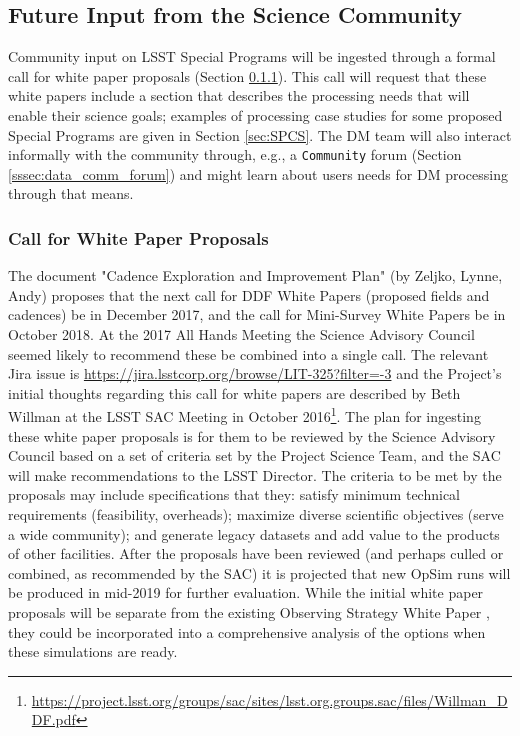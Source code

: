 \documentclass[DM,lsstdraft,toc]{lsstdoc}
\begin{document}
\subsection{Future Input from the Science Community} \label{ssec:data_comm}

Community input on LSST Special Programs will be ingested through a formal call for white paper proposals (Section \ref{sssec:data_comm_call}). This call will request that these white papers include a section that describes the processing needs that will enable their science goals; examples of processing case studies for some proposed Special Programs are given in Section \ref{sec:SPCS}. The DM team will also interact informally with the community through, e.g., a {\tt \Large{Community}} forum (Section \ref{sssec:data_comm_forum}) and might learn about users needs for DM processing through that means.

\subsubsection{Call for White Paper Proposals}\label{sssec:data_comm_call}

The document "Cadence Exploration and Improvement Plan" (by Zeljko, Lynne, Andy) proposes that the next call for DDF White Papers (proposed fields and cadences) be in December 2017, and the call for Mini-Survey White Papers be in October 2018. At the 2017 All Hands Meeting the Science Advisory Council seemed likely to recommend these be combined into a single call. The relevant Jira issue is \url{https://jira.lsstcorp.org/browse/LIT-325?filter=-3} and the Project's initial thoughts regarding this call for white papers are described by Beth Willman at the LSST SAC Meeting in October 2016\footnote{\url{https://project.lsst.org/groups/sac/sites/lsst.org.groups.sac/files/Willman_DDF.pdf}}. The plan for ingesting these white paper proposals is for them to be reviewed by the Science Advisory Council based on a set of criteria set by the Project Science Team, and the SAC will make recommendations to the LSST Director. The criteria to be met by the proposals may include specifications that they: satisfy minimum technical requirements (feasibility, overheads); maximize diverse scientific objectives (serve a wide community); and generate legacy datasets and add value to the products of other facilities. After the proposals have been reviewed (and perhaps culled or combined, as recommended by the SAC) it is projected that new OpSim runs will be produced in mid-2019 for further evaluation. While the initial white paper proposals will be separate from the existing Observing Strategy White Paper \cite{2017arXiv170804058L}, they could be incorporated into a comprehensive analysis of the options when these simulations are ready.
\end{document}
